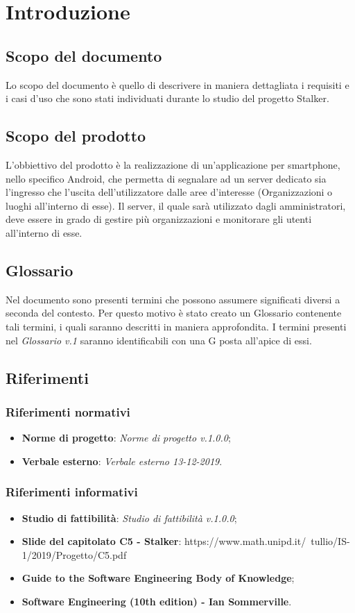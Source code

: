 \section{Introduzione}
\subsection{Scopo del documento}
Lo scopo del documento è quello di descrivere in maniera dettagliata i requisiti e i casi d'uso che sono stati individuati durante lo studio del progetto Stalker.
\subsection{Scopo del prodotto}
L'obbiettivo del prodotto è la realizzazione di un'applicazione per smartphone, nello specifico Android, che permetta di segnalare ad un server dedicato sia l'ingresso che l'uscita dell'utilizzatore dalle aree d'interesse (Organizzazioni o luoghi all'interno di esse).
Il server, il quale sarà utilizzato dagli amministratori, deve essere in grado di gestire più organizzazioni e monitorare gli utenti all'interno di esse.
\subsection{Glossario}
Nel documento sono presenti termini che possono assumere significati diversi a seconda del contesto. Per questo motivo è stato creato un Glossario contenente tali termini, i quali saranno descritti in maniera approfondita. I termini presenti nel \textit{Glossario v.1} saranno identificabili con una G posta all'apice di essi.

\subsection{Riferimenti}


\subsubsection{Riferimenti normativi}
\begin{itemize}
\item \textbf{Norme di progetto}: \textit{Norme di progetto v.1.0.0};
\item \textbf{Verbale esterno}: \textit{Verbale esterno 13-12-2019}.
\end{itemize}

\subsubsection{Riferimenti informativi}
\begin{itemize}
\item \textbf{Studio di fattibilità}: \textit{Studio di fattibilità v.1.0.0};
\item \textbf{Slide del capitolato C5 - Stalker}: https://www.math.unipd.it/~tullio/IS-1/2019/Progetto/C5.pdf
\item \textbf{Guide to the Software Engineering Body of Knowledge};
\item \textbf{Software Engineering (10th edition) - Ian Sommerville}.
\end{itemize}
